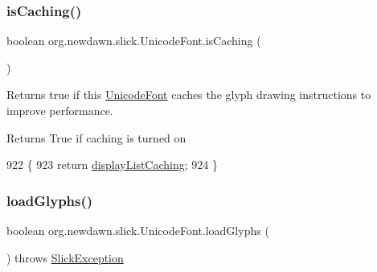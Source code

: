 \mbox{\label{classorg_1_1newdawn_1_1slick_1_1_unicode_font_a8b0c72ba9650c4535e0e9dd8ad4f1bd2}} 
\subsubsection{\texorpdfstring{is\+Caching()}{isCaching()}}
{\footnotesize\ttfamily boolean org.\+newdawn.\+slick.\+Unicode\+Font.\+is\+Caching (\begin{DoxyParamCaption}{ }\end{DoxyParamCaption})\hspace{0.3cm}{\ttfamily [inline]}}

Returns true if this \mbox{\hyperlink{classorg_1_1newdawn_1_1slick_1_1_unicode_font}{Unicode\+Font}} caches the glyph drawing instructions to improve performance.

\begin{DoxyReturn}{Returns}
True if caching is turned on 
\end{DoxyReturn}

\begin{DoxyCode}
922                                 \{
923         \textcolor{keywordflow}{return} \mbox{\hyperlink{classorg_1_1newdawn_1_1slick_1_1_unicode_font_aad1040617fd0167c54d6dd3511c6bd48}{displayListCaching}};
924     \}
\end{DoxyCode}
\mbox{\label{classorg_1_1newdawn_1_1slick_1_1_unicode_font_abf14d8ad33f80b66e14990417bd04088}} 
\subsubsection{\texorpdfstring{load\+Glyphs()}{loadGlyphs()}\hspace{0.1cm}{\footnotesize\ttfamily [1/2]}}
{\footnotesize\ttfamily boolean org.\+newdawn.\+slick.\+Unicode\+Font.\+load\+Glyphs (\begin{DoxyParamCaption}{ }\end{DoxyParamCaption}) throws \mbox{\hyperlink{classorg_1_1newdawn_1_1slick_1_1_slick_exception}{Slick\+Exception}}\hspace{0.3cm}{\ttfamily [inline]}}

